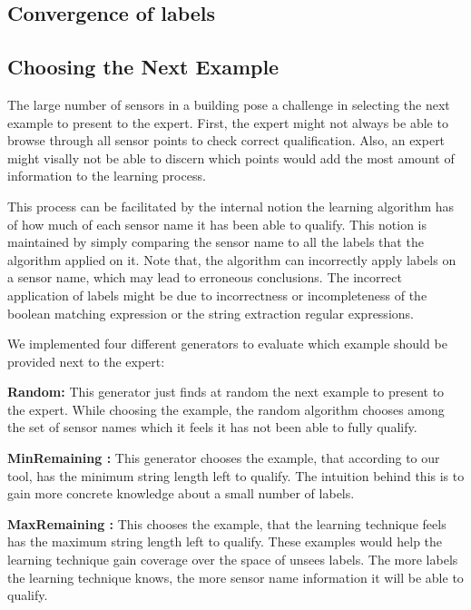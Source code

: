 \subsection{Convergence of labels}





\subsection{Choosing the Next Example}


The large number of sensors in a building pose a challenge in selecting the next example to present to the expert. First, the expert might not always be able to browse through all sensor points to check correct qualification. Also, an expert might visally not be able to discern which points would add the most amount of information to the learning process. 

This process can be facilitated by the internal notion the learning algorithm has of how much of each sensor name it has been able to qualify. This notion is maintained by simply comparing the sensor name to all the labels that the algorithm applied on it. Note that, the algorithm can incorrectly apply labels on a sensor name, which may lead to erroneous conclusions. The incorrect application of labels might be due to incorrectness or incompleteness of the boolean matching expression or the string extraction regular expressions.

We implemented four different generators to evaluate which example should be provided next to the expert:

{\bf Random:} This generator just finds at random the next example to present to the expert. While choosing the example, the random algorithm chooses among the set of sensor names which it feels it has not been able to fully qualify.  

{\bf MinRemaining :} This generator chooses the example, that according to our tool, has the minimum string length left to qualify. The intuition behind this is to gain more concrete knowledge about a small number of labels.

{\bf MaxRemaining :} This chooses the example, that the learning technique feels has the maximum string length left to qualify. These examples would help the learning technique gain coverage over the space of unsees labels. The more labels the learning technique knows, the more sensor name information it will be able to qualify.

